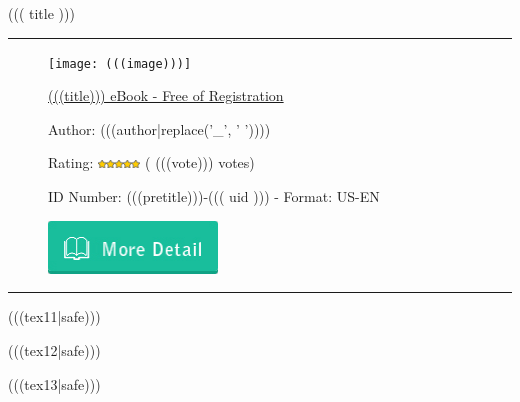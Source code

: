 \documentclass{article}
\newcommand{\garis}{\rule{\linewidth}{0.5mm}}
\begin{document}
{\color{blue}\noindent\huge{((( title )))}}

\noindent\garis


\begin{figure}[!htb]
    \begin{minipage}{.3\textwidth}
        \texttt{[image: (((image)))]}
    \end{minipage}%
    \begin{minipage}{0.7\textwidth}


      \href{http://(((domain)))/download/(((title|replace(' ', '-')))).pdf}{(((title))) eBook - Free of Registration}

      \vspace{12pt}

      Author: (((author|replace('_', ' '))))

      \vspace{12pt}

      Rating: \includegraphics[width=0.1\textwidth]{rating.png} ( (((vote))) votes)

      \vspace{12pt}

      ID Number: (((pretitle)))-((( uid ))) - Format: US-EN

      \vspace{12pt}

      \href{http://(((domain)))/download/(((title|replace(' ', '-')))).pdf}{\includegraphics[width=0.4\textwidth]{button.jpg}}

    \end{minipage}
\end{figure}

\noindent\garis

\vspace{12pt}

(((tex11|safe)))

(((tex12|safe)))

(((tex13|safe)))

\vspace{16pt}
\end{document}
